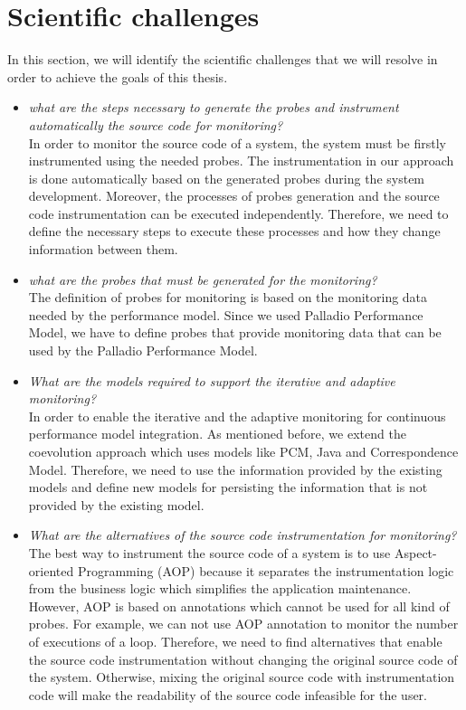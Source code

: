 \section{Scientific challenges}
\label{sec:Scientific challenges}
In this section, we will identify the scientific challenges that we will resolve in order to achieve the goals of this thesis. 
\begin{itemize}
\item \textit{what are the steps necessary to generate the probes and instrument automatically the source code for monitoring?} \\
In order to monitor the source code of a system, the system must be firstly instrumented using the needed probes. The instrumentation in our approach is done automatically based on the generated probes during the system development. Moreover, the processes of probes generation and the source code instrumentation can be executed independently. Therefore, we need to define the necessary steps to execute these processes and how they change information between them.

\item \textit{what are the probes that must be generated for the monitoring?}\\
The definition of probes for monitoring is based on the monitoring data needed by the performance model. Since we used Palladio Performance Model, we have to define probes that provide monitoring data that can be used by the Palladio Performance Model.
 
\item \textit{What are the models required to support the iterative and adaptive monitoring?}\\
In order to enable the iterative and the adaptive monitoring for continuous performance model integration. As mentioned before, we extend the coevolution approach which uses models like PCM, Java and Correspondence Model. Therefore, we need to use the information provided by the existing models and define new models for persisting the information that is not provided by the existing model.

\item \textit{What are the alternatives of the source code instrumentation for monitoring?}\\
The best way to instrument the source code of a system is to use Aspect-oriented Programming (AOP) because it separates the instrumentation logic from the business logic which simplifies the application maintenance. However, AOP is based on annotations which cannot be used for all kind of probes. For example, we can not use AOP annotation to monitor the number of executions of a loop. Therefore, we need to find alternatives that enable the source code instrumentation without changing the original source code of the system. Otherwise, mixing the original source code with instrumentation code will make the readability of the source code infeasible for the user. 


\end{itemize}

